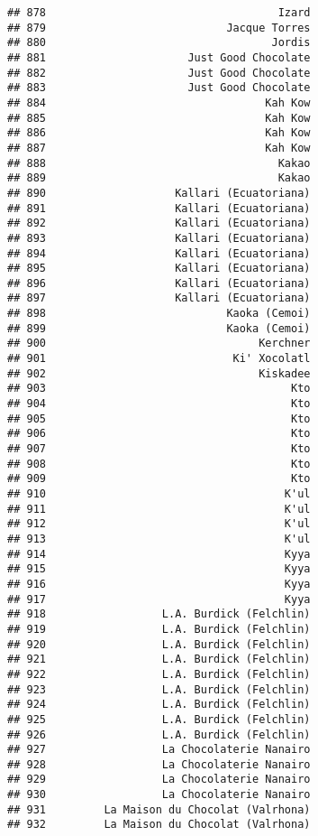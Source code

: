 \documentclass[
]{article}
\begin{document}
\begin{verbatim}
## 878                                    Izard
## 879                            Jacque Torres
## 880                                   Jordis
## 881                      Just Good Chocolate
## 882                      Just Good Chocolate
## 883                      Just Good Chocolate
## 884                                  Kah Kow
## 885                                  Kah Kow
## 886                                  Kah Kow
## 887                                  Kah Kow
## 888                                    Kakao
## 889                                    Kakao
## 890                    Kallari (Ecuatoriana)
## 891                    Kallari (Ecuatoriana)
## 892                    Kallari (Ecuatoriana)
## 893                    Kallari (Ecuatoriana)
## 894                    Kallari (Ecuatoriana)
## 895                    Kallari (Ecuatoriana)
## 896                    Kallari (Ecuatoriana)
## 897                    Kallari (Ecuatoriana)
## 898                            Kaoka (Cemoi)
## 899                            Kaoka (Cemoi)
## 900                                 Kerchner
## 901                             Ki' Xocolatl
## 902                                 Kiskadee
## 903                                      Kto
## 904                                      Kto
## 905                                      Kto
## 906                                      Kto
## 907                                      Kto
## 908                                      Kto
## 909                                      Kto
## 910                                     K'ul
## 911                                     K'ul
## 912                                     K'ul
## 913                                     K'ul
## 914                                     Kyya
## 915                                     Kyya
## 916                                     Kyya
## 917                                     Kyya
## 918                  L.A. Burdick (Felchlin)
## 919                  L.A. Burdick (Felchlin)
## 920                  L.A. Burdick (Felchlin)
## 921                  L.A. Burdick (Felchlin)
## 922                  L.A. Burdick (Felchlin)
## 923                  L.A. Burdick (Felchlin)
## 924                  L.A. Burdick (Felchlin)
## 925                  L.A. Burdick (Felchlin)
## 926                  L.A. Burdick (Felchlin)
## 927                  La Chocolaterie Nanairo
## 928                  La Chocolaterie Nanairo
## 929                  La Chocolaterie Nanairo
## 930                  La Chocolaterie Nanairo
## 931         La Maison du Chocolat (Valrhona)
## 932         La Maison du Chocolat (Valrhona)

\end{verbatim}
\end{document}
